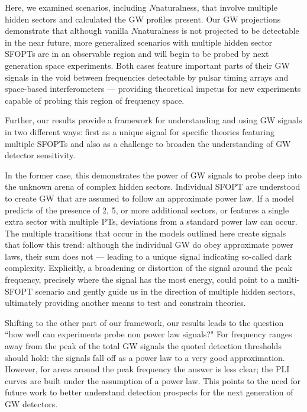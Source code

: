 \documentclass[nofootinbib,twocolumn,preprintnumbers]{revtex4-1}
\begin{document}
Here, we examined scenarios, including $N$naturalness, that involve multiple hidden sectors and calculated the GW profiles present. Our GW projections demonstrate that although vanilla $N$naturalness is not projected to be detectable in the near future, more generalized scenarios with multiple hidden sector SFOPTs are in an observable region and will begin to be probed by next generation space experiments. Both cases feature important parts of their GW signals in the void between frequencies detectable by pulsar timing arrays and space-based interferometers --- providing theoretical impetus for new experiments capable of probing this region of frequency space. 

Further, our results provide a framework for understanding and using GW signals in two different ways: first as a unique signal for specific theories featuring multiple SFOPTs and also as a challenge to broaden the understanding of GW detector sensitivity. 

In the former case, this demonstrates the power of GW signals to probe deep into the unknown arena of complex hidden sectors. Individual SFOPT are understood to create GW that are assumed to follow an approximate power law. If a model predicts of the presence of 2, 5, or more additional sectors, or features a single extra sector with multiple PTs, deviations from a standard power law can occur. The multiple transitions that occur in the models outlined here create signals that follow this trend: although the individual GW do obey approximate power laws, their sum does not --- leading to a unique signal indicating so-called dark complexity. Explicitly, a broadening or distortion of the signal around the peak frequency, precisely where the signal has the most energy, could point to a multi-SFOPT scenario and gently guide us in the direction of multiple hidden sectors, ultimately providing another means to test and constrain theories.   

Shifting to the other part of our framework, our results leads to the question ``how well can experiments probe non power law signals?" For frequency ranges away from the peak of the total GW signals the quoted detection thresholds should hold: the signals fall off as a power law to a very good approximation. However, for areas around the peak frequency the answer is less clear; the PLI curves are built under the assumption of a power law. This points to the need for future work to better understand detection prospects for the next generation of GW detectors. 
\end{document}
